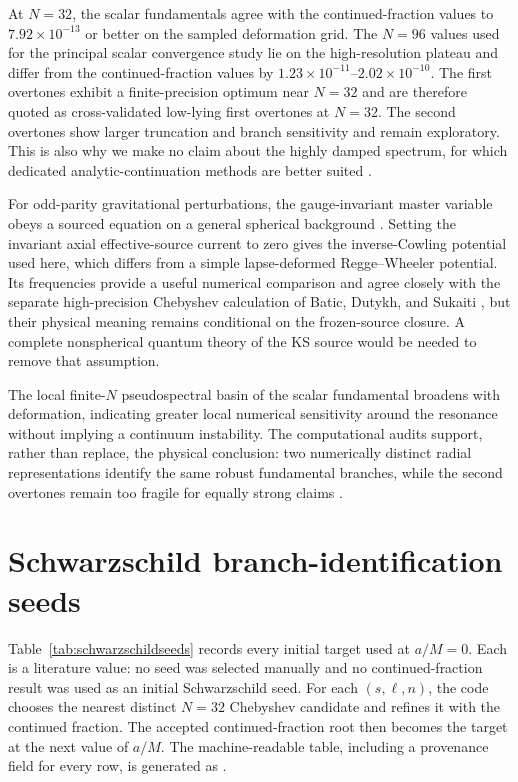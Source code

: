 \documentclass[12pt,a4paper]{article}
\begin{document}
\color{blue}
At \(N=32\), the scalar fundamentals agree with the continued-fraction values
to \(7.92\times10^{-13}\) or better on the sampled deformation grid. The
\(N=96\) values used for the principal scalar convergence study lie on the
high-resolution plateau and differ from the continued-fraction values by
\(1.23\times10^{-11}\)--\(2.02\times10^{-10}\). The first overtones exhibit a
finite-precision optimum near \(N=32\) and are therefore quoted as
cross-validated low-lying first overtones at \(N=32\). The second overtones
show larger truncation and branch sensitivity and remain exploratory. This is
also why we make no claim about the highly damped spectrum, for which dedicated
analytic-continuation methods are better suited \cite{Chen2025}.
\color{black}

\color{blue}
For odd-parity gravitational perturbations, the gauge-invariant master variable
obeys a sourced equation on a general spherical background
\cite{Gerlach1979,Gundlach1999,Karlovini2002}. Setting the invariant axial
effective-source current to zero gives the inverse-Cowling potential used here,
which differs from a simple lapse-deformed Regge--Wheeler potential. Its
frequencies provide a useful numerical comparison and agree closely with the
separate high-precision Chebyshev calculation of Batic, Dutykh, and Sukaiti
\cite{BaticDutykhSukaiti2026}, but their
physical meaning remains conditional on the frozen-source closure. A complete
nonspherical quantum theory of the KS source would be needed to remove that
assumption.

The local finite-\(N\) pseudospectral basin of the scalar fundamental broadens
with deformation, indicating greater local numerical sensitivity around the
resonance without implying a continuum instability.  The computational audits
support, rather than replace, the physical conclusion: two numerically distinct
radial representations identify the same robust fundamental branches, while the
second overtones remain too fragile for equally strong claims
\cite{Leaver1985,Jansen2017,Jaramillo2021}.

\appendix
\section{Schwarzschild branch-identification seeds}
\label{sec:schwarzschildseeds}

Table~\ref{tab:schwarzschildseeds} records every initial target used at
\(a/M=0\). Each is a literature value: no seed was selected manually and no
continued-fraction result was used as an initial Schwarzschild seed. For each
\((s,\ell,n)\), the code chooses the nearest distinct \(N=32\) Chebyshev
candidate and refines it with the continued fraction. The accepted
continued-fraction root then becomes the target at the next value of \(a/M\).
The machine-readable table, including a provenance field for every row, is
generated as .
\end{document}
